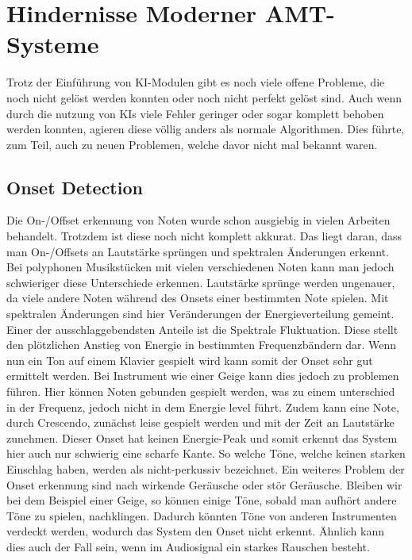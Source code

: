 \section{Hindernisse Moderner AMT-Systeme}
Trotz der Einführung von KI-Modulen gibt es noch viele offene Probleme, die noch nicht gelöst werden konnten
oder noch nicht perfekt gelöst sind.
Auch wenn durch die nutzung von KIs viele Fehler geringer oder sogar komplett behoben werden konnten,
agieren diese völlig anders als normale Algorithmen.
Dies führte, zum Teil, auch zu neuen Problemen, welche davor nicht mal bekannt waren.

\subsection{Onset Detection}
Die On-/Offset erkennung von Noten wurde schon ausgiebig in vielen Arbeiten behandelt.
Trotzdem ist diese noch nicht komplett akkurat.
Das liegt daran, dass man On-/Offsets an Lautstärke sprüngen und spektralen Änderungen erkennt.
Bei polyphonen Musikstücken mit vielen verschiedenen Noten kann man jedoch schwieriger diese Unterschiede erkennen.
Lautstärke sprünge werden ungenauer, da viele andere Noten während des Onsets einer bestimmten Note spielen.
Mit spektralen Änderungen sind hier Veränderungen der Energieverteilung gemeint.
Einer der ausschlaggebendsten Anteile ist die Spektrale Fluktuation.
Diese stellt den plötzlichen Anstieg von Energie in bestimmten Frequenzbändern dar.
Wenn nun ein Ton auf einem Klavier gespielt wird kann somit der Onset sehr gut ermittelt werden.
Bei Instrument wie einer Geige kann dies jedoch zu problemen führen.
Hier können Noten gebunden gespielt werden, was zu einem unterschied in der Frequenz,
jedoch nicht in dem Energie level führt.
Zudem kann eine Note, durch Crescendo, zunächst leise gespielt werden und mit der Zeit an Lautstärke zunehmen.
Dieser Onset hat keinen Energie-Peak und somit erkennt das System hier auch nur schwierig eine scharfe Kante.
So welche Töne, welche keinen starken Einschlag haben, werden als nicht-perkussiv bezeichnet.
Ein weiteres Problem der Onset erkennung sind nach wirkende Geräusche oder stör Geräusche.
Bleiben wir bei dem Beispiel einer Geige, so können einige Töne, sobald man aufhört andere Töne zu spielen, nachklingen.
Dadurch könnten Töne von anderen Instrumenten verdeckt werden, wodurch das System den Onset nicht erkennt.
Ähnlich kann dies auch der Fall sein, wenn im Audiosignal ein starkes Rauschen besteht.

